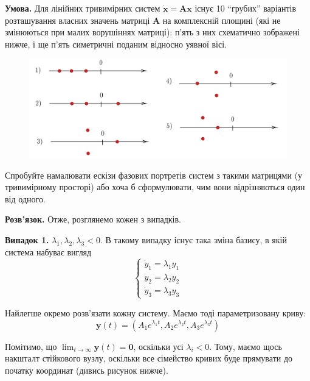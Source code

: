 \documentclass[oneside,solution]{tmpl}
\begin{document}
\hspace{20px}\textbf{Умова.} Для лінійних тривимірних систем $\dot{\mathbf{x}} = \boldsymbol{A}\mathbf{x}$ існує 10 ``грубих'' варіантів розташування власних значень матриці $\boldsymbol{A}$ на комплексній площині (які не змінюються при малих ворушіннях матриці): п'ять з них схематично зображені нижче, і ще п'ять симетричні поданим відносно уявної вісі.

\begin{figure}[H]
    \centering
    \includegraphics[width=\textwidth]{images/hw_8/problem_2_statement.png}
\end{figure}

Спробуйте намалювати ескізи фазових портретів систем з такими матрицями (у тривимірному просторі) або хоча б сформулювати, чим вони відрізняються один від одного.

\textbf{Розв'язок.} Отже, розглянемо кожен з випадків.

\textbf{Випадок 1.} $\lambda_1, \lambda_2,\lambda_3 < 0$. В такому випадку існує така зміна базису, в якій система набуває вигляд
\begin{equation}
    \begin{cases}
    \dot{y}_1 = \lambda_1 y_1 \\
    \dot{y}_2 = \lambda_2 y_2 \\
    \dot{y}_3 = \lambda_3 y_3
    \end{cases}
\end{equation}

Найлегше окремо розв'язати кожну систему. Маємо тоді параметризовану криву:
\begin{equation}
    \mathbf{y}(t) = (A_1 e^{\lambda_1 t}, A_2 e^{\lambda_2 t}, A_3 e^{\lambda_3 t})
\end{equation}

Помітимо, що $\lim_{t \to \infty}\mathbf{y}(t) = \mathbf{0}$, оскільки усі $\lambda_i < 0$. Тому, маємо щось накшталт стійкового вузлу, оскільки все сімейство кривих буде прямувати до початку координат (дивись рисунок нижче). 
\end{document}
